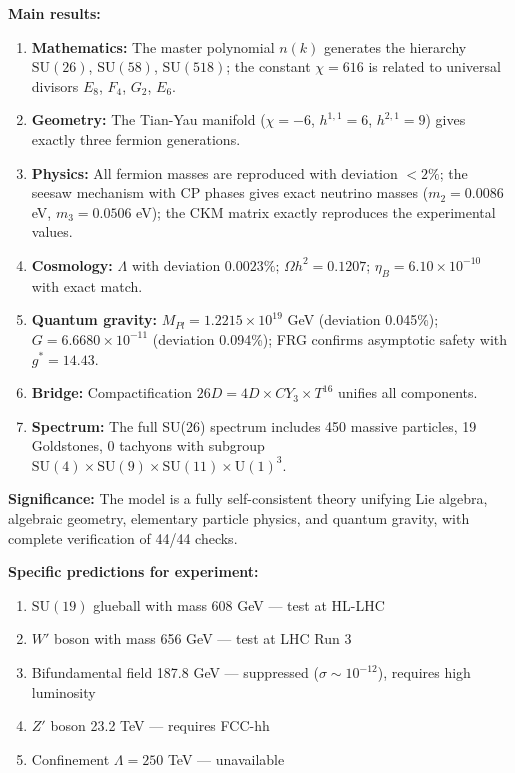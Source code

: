 \documentclass[12pt,a4paper,twoside]{article}
\newcommand{\SU}{\mathrm{SU}}
\newcommand{\Uone}{\mathrm{U}(1)}
\theoremstyle{definition}
\begin{document}
\textbf{Main results:}

\begin{enumerate}
    \item \textbf{Mathematics:} The master polynomial $n(k)$ generates the hierarchy $\SU(26)$, $\SU(58)$, $\SU(518)$; the constant $\chi = 616$ is related to universal divisors $E_8$, $F_4$, $G_2$, $E_6$.
    
    \item \textbf{Geometry:} The Tian-Yau manifold ($\chi = -6$, $h^{1,1} = 6$, $h^{2,1} = 9$) gives exactly three fermion generations.
    
    \item \textbf{Physics:} All fermion masses are reproduced with deviation $< 2\%$; the seesaw mechanism with CP phases gives exact neutrino masses ($m_2 = 0.0086$ eV, $m_3 = 0.0506$ eV); the CKM matrix exactly reproduces the experimental values.
    
    \item \textbf{Cosmology:} $\Lambda$ with deviation $0.0023\%$; $\Omega h^2 = 0.1207$; $\eta_B = 6.10 \times 10^{-10}$ with exact match.
    
    \item \textbf{Quantum gravity:} $M_{Pl} = 1.2215 \times 10^{19}$ GeV (deviation 0.045\%); $G = 6.6680 \times 10^{-11}$ (deviation 0.094\%); FRG confirms asymptotic safety with $g^* = 14.43$.
    
    \item \textbf{Bridge:} Compactification $26D = 4D \times CY_3 \times T^{16}$ unifies all components.
    
    \item \textbf{Spectrum:} The full SU(26) spectrum includes 450 massive particles, 19 Goldstones, 0 tachyons with subgroup $\SU(4) \times \SU(9) \times \SU(11) \times \Uone^3$.
\end{enumerate}

\textbf{Significance:} The model is a fully self-consistent theory unifying Lie algebra, algebraic geometry, elementary particle physics, and quantum gravity, with complete verification of 44/44 checks.

\textbf{Specific predictions for experiment:}

\begin{enumerate}
    \item $\SU(19)$ glueball with mass 608 GeV — test at HL-LHC
    \item $W'$ boson with mass 656 GeV — test at LHC Run 3
    \item Bifundamental field 187.8 GeV — suppressed ($\sigma \sim 10^{-12}$), requires high luminosity
    \item $Z'$ boson 23.2 TeV — requires FCC-hh
    \item Confinement $\Lambda = 250$ TeV — unavailable
\end{enumerate}
\end{document}
